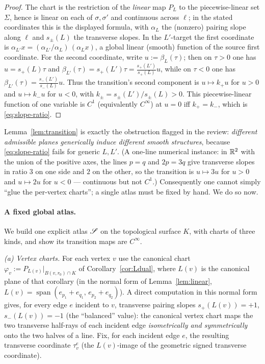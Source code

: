 \begin{proof}
The chart is the restriction of the \emph{linear} map $P_L$ to the piecewise-linear
set $\Sigma$, hence is linear on each of $\sigma,\sigma'$ and continuous across
$\ell$; in the stated coordinates this is the displayed formula, with $\alpha_L$
the (nonzero) pairing slope along $\ell$ and $s_\pm(L)$ the transverse slopes. In
the $L'$-target the first coordinate is $\alpha_{L'}x=(\alpha_{L'}/\alpha_L)\,(\alpha_L x)$,
a global linear (smooth) function of the source first coordinate. For the second
coordinate, write $u:=\beta_L(\tau)$; then on $\tau>0$ one has $u=s_+(L)\tau$ and
$\beta_{L'}(\tau)=s_+(L')\tau=\frac{s_+(L')}{s_+(L)}u$, while on $\tau<0$ one has
$\beta_{L'}(\tau)=\frac{s_-(L')}{s_-(L)}u$. Thus the transition's second component
is $u\mapsto k_+u$ for $u>0$ and $u\mapsto k_-u$ for $u<0$, with
$k_\pm=s_\pm(L')/s_\pm(L)>0$. This piecewise-linear function of one variable is
$C^1$ (equivalently $C^\infty$) at $u=0$ iff $k_+=k_-$, which is
\eqref{eq:slope-ratio}.
\end{proof}

\noindent Lemma~\ref{lem:transition} is exactly the obstruction flagged in the
review: \emph{different admissible planes generically induce different smooth
structures}, because \eqref{eq:slope-ratio} fails for generic $L,L'$. (A one-line
numerical instance: in $\mathbb{R}^2$ with the union of the positive axes, the lines
$p=q$ and $2p=3q$ give transverse slopes in ratio $3$ on one side and $2$ on the
other, so the transition is $u\mapsto3u$ for $u>0$ and $u\mapsto2u$ for $u<0$ ---
continuous but not $C^1$.) Consequently one cannot simply ``glue the per-vertex
charts''; a single atlas must be fixed by hand. We do so now.

\paragraph{A fixed global atlas.}
We build one explicit atlas $\mathscr S$ on the topological surface $K$, with charts of
three kinds, and show its transition maps are $C^\infty$.

\emph{(a) Vertex charts.} For each vertex $v$ use the canonical chart
$\varphi_v:=P_{L(v)}|_{B(v,r_0)\cap K}$ of Corollary~\ref{cor:Ldual}, where
$L(v)$ is the canonical plane of that corollary (in the normal form of
Lemma~\ref{lem:linear}, $L(v)=\operatorname{span}(e_{p_1}+e_{q_1},\,
e_{p_2}+e_{q_2})$). A direct computation in this normal form gives, for every edge
$e$ incident to $v$, transverse pairing slopes $s_+(L(v))=+1$, $s_-(L(v))=-1$ (the
``balanced'' value): the canonical vertex chart maps the two transverse half-rays
of each incident edge \emph{isometrically and symmetrically} onto the two halves of
a line. Fix, for each incident edge $e$, the resulting transverse coordinate
$\tau_v^e$ (the $L(v)$-image of the geometric signed transverse coordinate).

